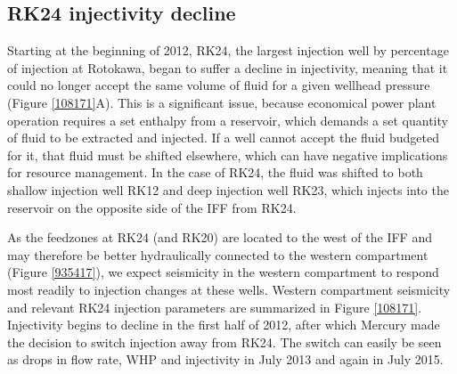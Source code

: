 \subsection{RK24 injectivity decline}
Starting at the beginning of 2012, RK24, the largest injection well by percentage of injection at Rotokawa, began to suffer a decline in injectivity, meaning that it could no longer accept the same volume of fluid for a given wellhead pressure (Figure \ref{108171}A). This is a significant issue, because economical power plant operation requires a set enthalpy from a reservoir, which demands a set quantity of fluid to be extracted and injected. If a well cannot accept the fluid budgeted for it, that fluid must be shifted elsewhere, which can have negative implications for resource management. In the case of RK24, the fluid was shifted to both shallow injection well RK12 and deep injection well RK23, which injects into the reservoir on the opposite side of the IFF from RK24.

As the feedzones at RK24 (and RK20) are located to the west of the IFF and may therefore be better hydraulically connected to the western compartment (Figure \ref{935417}), we expect seismicity in the western compartment to respond most readily to injection changes at these wells. Western compartment seismicity and relevant RK24 injection parameters are summarized in Figure \ref{108171}. Injectivity begins to decline in the first half of 2012, after which Mercury made the decision to switch injection away from RK24. The switch can easily be seen as drops in flow rate, WHP and injectivity in July 2013 and again in July 2015.


